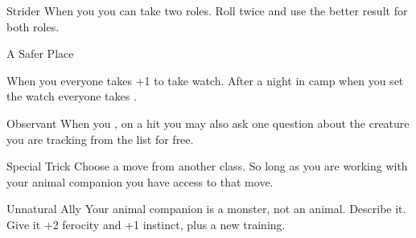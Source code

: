 \documentclass[8pt]{extarticle}
\begin{document}
\begin{multicols}{2}
\begin{amove}{Strider}
When you  you can take two
roles. Roll twice and use the better result for both roles.
\end{amove}

\begin{amove}{A Safer Place}

  When you  everyone takes +1
  to take watch. After a night in camp when you set the watch everyone
  takes .
\end{amove}

\begin{amove}{Observant}
  When you , on a hit you may also ask one
  question about the creature you are tracking from the  list for free.
\end{amove}

\begin{amove}{Special Trick}
  Choose a move from another class. So long as you are working with
  your animal companion you have access to that move.
\end{amove}

\begin{amove}{Unnatural Ally}
  Your animal companion is a monster, not an animal. Describe it. Give
  it +2 ferocity and +1 instinct, plus a new training.
\end{amove}


\vfill\null
\end{multicols}
\end{document}
